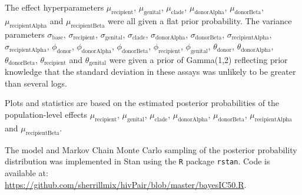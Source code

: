 \documentclass[12pt]{article}
\begin{document}
The effect hyperparameters
$\mu_{\text{recipient}}$, $\mu_{\text{genital}}$, $\mu_{\text{clade}}$, $\mu_{\text{donorAlpha}}$, $\mu_{\text{donorBeta}}$, $\mu_{\text{recipientAlpha}}$ and $\mu_{\text{recipientBeta}}$ were all given a flat prior probability.
The variance parameters 
$\sigma_{\text{base}}$, $\sigma_{\text{recipient}}$, $\sigma_{\text{genital}}$, $\sigma_{\text{clade}}$, $\sigma_{\text{donorAlpha}}$, $\sigma_{\text{donorBeta}}$, $\sigma_{\text{recipientAlpha}}$, $\sigma_{\text{recipientAlpha}}$,
$\phi_{\text{donor}}$, $\phi_{\text{donorAlpha}}$, $\phi_{\text{donorBeta}}$, $\phi_{\text{recipient}}$, $\phi_{\text{genital}}$,
$\theta_{\text{donor}}$, $\theta_{\text{donorAlpha}}$, $\theta_{\text{donorBeta}}$, $\theta_{\text{recipient}}$ and $\theta_{\text{genital}}$ 
were given a prior of Gamma(1,2) reflecting prior knowledge that the standard deviation in these assays was unlikely to be greater than several logs. %

Plots and statistics are based on the estimated posterior probabilities of the population-level effects $\mu_{\text{recipient}}$, $\mu_{\text{genital}}$, $\mu_{\text{clade}}$, $\mu_{\text{donorAlpha}}$, $\mu_{\text{donorBeta}}$, $\mu_{\text{recipientAlpha}}$ and $\mu_{\text{recipientBeta}}$.

The model and Markov Chain Monte Carlo sampling of the posterior probability distribution was implemented in Stan using the \texttt{R} package \texttt{rstan}. Code is available at:\\
\url{https://github.com/sherrillmix/hivPair/blob/master/bayesIC50.R}.
\end{document}
